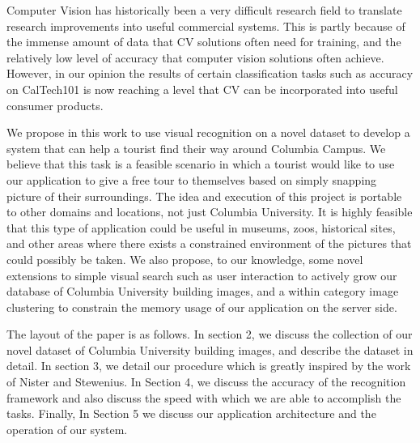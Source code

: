 Computer Vision has historically been a very difficult research field to translate research improvements into useful commercial systems.  
This is partly because of the immense amount of data that CV solutions often need for training, and the relatively low level of accuracy that computer vision solutions often achieve.
However, in our opinion the results of certain classification tasks such as accuracy on CalTech101\cite{fei-fei:caltech101} is now reaching a level that CV can be incorporated into useful consumer products.

We propose in this work to use visual recognition on a novel dataset to develop a system that can help a tourist find their way around Columbia Campus.
We believe that this task is a feasible scenario in which a tourist would like to use our application to give a free tour to themselves based on simply snapping picture of their surroundings.
The idea and execution of this project is portable to other domains and locations, not just Columbia University.
It is highly feasible that this type of application could be useful in museums, zoos, historical sites, and other areas where there exists a constrained environment of the pictures that could possibly be taken.
We also propose, to our knowledge, some novel extensions to simple visual search such as user interaction to actively grow our database of Columbia University building images, and a within category image clustering to constrain the memory usage of our application on the server side.

The layout of the paper is as follows.
In section 2, we discuss the collection of our novel dataset of Columbia University building images, and describe the dataset in detail.
In section 3, we detail our procedure which is greatly inspired by the work of Nister and Stewenius\cite{nister:vocabtree}.
In Section 4, we discuss the accuracy of the recognition framework and also discuss the speed with which we are able to accomplish the tasks.
Finally, In Section 5 we discuss our application architecture and the operation of our system.
